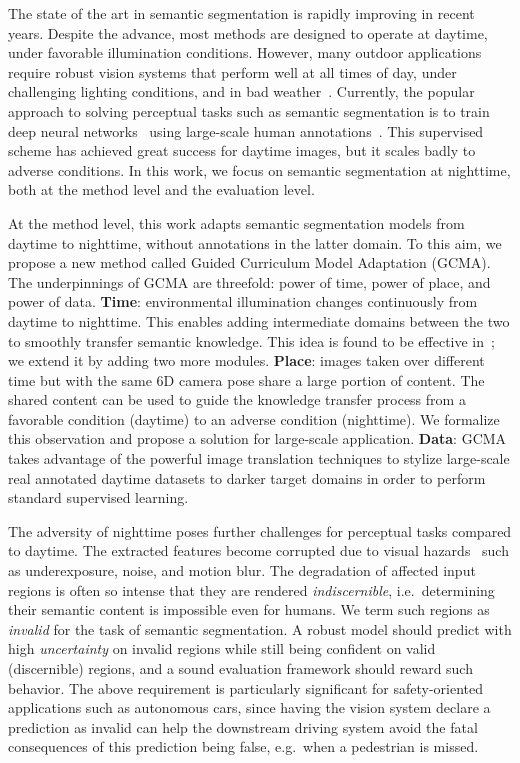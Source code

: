 \documentclass[10pt,twocolumn,letterpaper]{article}
\begin{document}
The state of the art in semantic segmentation is rapidly improving in recent years. Despite the advance, most methods are designed to operate at daytime, under favorable illumination conditions. However, many outdoor applications require robust vision systems that perform well at all times of day, under challenging lighting conditions, and in bad weather~\cite{vision:atmosphere}. Currently, the popular approach to solving perceptual tasks such as semantic segmentation is to train deep neural networks~\cite{pspnet,refinenet,dilated:convolution} using large-scale human annotations~\cite{pascal:2011,Cityscapes,Mapillary}. This supervised scheme has achieved great success for daytime images, but it scales badly to adverse conditions.  In this work, we focus on semantic segmentation at nighttime, both at the method level and the evaluation level. 

At the method level, this work adapts semantic segmentation models from daytime to nighttime, without annotations in the latter domain.
To this aim, we propose a new method called Guided Curriculum Model Adaptation (GCMA). The underpinnings of GCMA are threefold: power of time, power of place, and power of data. \textbf{Time}: environmental illumination changes continuously from daytime to nighttime. This enables adding intermediate domains between the two to smoothly transfer semantic knowledge. This idea is found to be effective in~\cite{SynRealDataFogECCV18,daytime:2:nighttime}; we extend it by adding two more modules. \textbf{Place}: images taken over different time but with the same 6D camera pose share a large portion of content. The shared content can be used to guide the knowledge transfer process from a favorable condition (daytime) to an adverse condition (nighttime). We formalize this observation and propose a solution for large-scale application. \textbf{Data}: GCMA takes advantage of the powerful image translation techniques to stylize large-scale real annotated daytime datasets to darker target domains in order to perform standard supervised learning.

The adversity of nighttime poses further challenges for perceptual tasks compared to daytime. The extracted features become corrupted due to visual hazards~\cite{cv:hazop} such as underexposure, noise, and motion blur. The degradation of affected input regions is often so intense that they are rendered \emph{indiscernible}, i.e.\ determining their semantic content is impossible even for humans. We term such regions as \emph{invalid} for the task of semantic segmentation. A robust model should predict with high \emph{uncertainty} on invalid regions while still being confident on valid (discernible) regions, and a sound evaluation framework should reward such behavior. The above requirement is particularly significant for safety-oriented applications such as autonomous cars, since having the vision system declare a prediction as invalid can help the downstream driving system avoid the fatal consequences of this prediction being false, e.g.\ when a pedestrian is missed.
\end{document}
